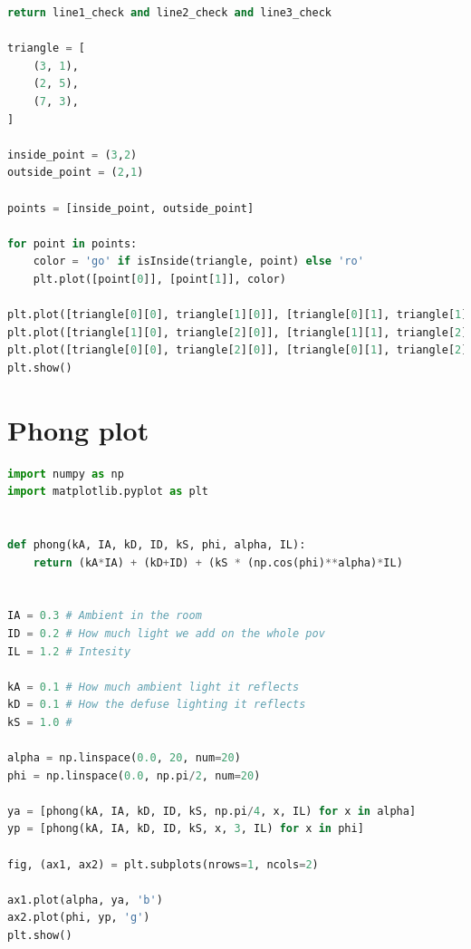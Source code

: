 \documentclass{article}
\begin{document}
\begin{appendices}
\begin{lstlisting}[language=python]
    return line1_check and line2_check and line3_check

triangle = [
    (3, 1),
    (2, 5),
    (7, 3),
]

inside_point = (3,2)
outside_point = (2,1)

points = [inside_point, outside_point]

for point in points:
    color = 'go' if isInside(triangle, point) else 'ro'
    plt.plot([point[0]], [point[1]], color)

plt.plot([triangle[0][0], triangle[1][0]], [triangle[0][1], triangle[1][1]], 'b')
plt.plot([triangle[1][0], triangle[2][0]], [triangle[1][1], triangle[2][1]], 'b')
plt.plot([triangle[0][0], triangle[2][0]], [triangle[0][1], triangle[2][1]], 'b')
plt.show()
        \end{lstlisting}
        \section{Phong plot}
        \label{appendix:pho}
        \begin{lstlisting}[language=python]
import numpy as np
import matplotlib.pyplot as plt


def phong(kA, IA, kD, ID, kS, phi, alpha, IL):
    return (kA*IA) + (kD+ID) + (kS * (np.cos(phi)**alpha)*IL)


IA = 0.3 # Ambient in the room
ID = 0.2 # How much light we add on the whole pov
IL = 1.2 # Intesity 

kA = 0.1 # How much ambient light it reflects
kD = 0.1 # How the defuse lighting it reflects
kS = 1.0 # 

alpha = np.linspace(0.0, 20, num=20)
phi = np.linspace(0.0, np.pi/2, num=20)

ya = [phong(kA, IA, kD, ID, kS, np.pi/4, x, IL) for x in alpha]
yp = [phong(kA, IA, kD, ID, kS, x, 3, IL) for x in phi]

fig, (ax1, ax2) = plt.subplots(nrows=1, ncols=2)

ax1.plot(alpha, ya, 'b')
ax2.plot(phi, yp, 'g')
plt.show()
            

        \end{lstlisting}

    \end{appendices}
\end{document}
